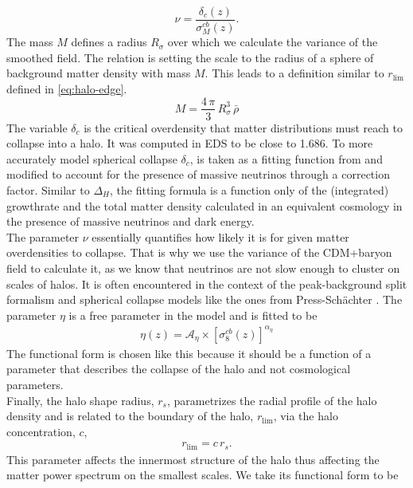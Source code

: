 \documentclass[../main.tex]{subfiles}
\begin{document}
\begin{equation}
\nu = \frac{\delta_c(z)}{\sigma^{cb}_M(z)}.
\end{equation}
The mass $M$ defines a radius $R_\sigma$ over which we calculate the variance of the smoothed field. The relation is setting the scale to the radius of a sphere of background matter density with mass $M$. This leads to a definition similar to $r_\mathrm{lim}$ defined in \ref{eq:halo-edge}.
\begin{equation*}
    M =  \frac{4\,\pi}{3}\,R_\sigma^3\,\bar{\rho}
\end{equation*}
The variable $\delta_c$ is the critical overdensity that matter distributions must reach to collapse into a halo. It was computed in EDS to be close to 1.686. To more accurately model spherical collapse $\delta_c$, is taken as a fitting function from \cite{Nakamura_1997} and modified to account for the presence of massive neutrinos through a correction factor. Similar to $\Delta_H$, the fitting formula is a function only of the (integrated) growthrate and the total matter density calculated in an equivalent cosmology in the presence of massive neutrinos and dark energy.\\
The parameter $\nu$ essentially quantifies how likely it is for given matter overdensities to collapse. That is why we use the variance of the CDM+baryon field to calculate it, as we know that neutrinos are not slow enough to cluster on scales of halos. It is often encountered in the context of the peak-background split formalism and spherical collapse models like the ones from Press-Schächter \cite{1974ApJ...187..425P}. The parameter $\eta$ is a free parameter in the \hmcode model and is fitted to be \begin{align}
    \eta(z)=\mathcal{A}_\eta\times\left[\sigma_8^{cb}(z)\right]^{\alpha_\eta}
\end{align}
 The functional form is chosen like this because it should be a function of a parameter that describes the collapse of the halo and not cosmological parameters.\\
Finally, the halo shape radius, $r_s$, parametrizes the radial profile of the halo density and is related to the boundary of the halo, $r_\mathrm{lim}$, via the halo concentration, $c$, \begin{align*}
    r_\mathrm{lim} = c\,r_s.
\end{align*}
This parameter affects the innermost structure of the halo thus affecting the matter power spectrum on the smallest scales. We take its functional form to be
\end{document}
